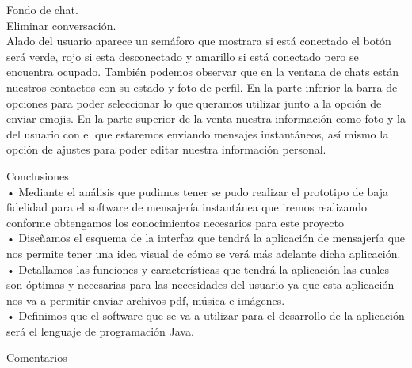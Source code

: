 \documentclass[11pt,a4paper]{report}
\begin{document}
Fondo  de chat.\newline\\ 
Eliminar conversación.\newline\\ 
Alado del usuario aparece un semáforo que mostrara si está conectado el botón será verde,\vspace{0,5cm} rojo si esta desconectado y amarillo si está conectado pero se encuentra ocupado.
También\vspace{0,5cm} podemos observar que en la ventana de chats están nuestros contactos con su estado y foto\vspace{0,5cm} de perfil. En la parte inferior la barra de opciones para poder seleccionar lo que queramos\vspace{0,5cm} utilizar junto a la opción de enviar emojis.
En la parte superior de la venta nuestra\vspace{0,5cm} información como foto y la del usuario con el que estaremos enviando mensajes instantáneos,\vspace{0,5cm} así mismo la opción de ajustes para poder editar nuestra información personal.\newpage

Conclusiones\newline\\ 

•	Mediante el análisis que pudimos tener se pudo realizar el prototipo de baja fidelidad para el software de mensajería instantánea que iremos realizando  conforme obtengamos los conocimientos necesarios para este proyecto\newline\\ 

•	Diseñamos el esquema de la interfaz que tendrá la aplicación de mensajería que nos permite tener una idea visual de cómo se verá más adelante dicha aplicación.\newline\\ 


•	Detallamos  las funciones y características que tendrá la aplicación las cuales son óptimas y necesarias  para las necesidades del usuario  ya que esta aplicación nos va a permitir enviar archivos pdf, música e imágenes.\newline\\ 


•	Definimos que el software que se va a utilizar para el desarrollo de la aplicación será el lenguaje de programación Java.\newpage

Comentarios \newline\\
\end{document}
